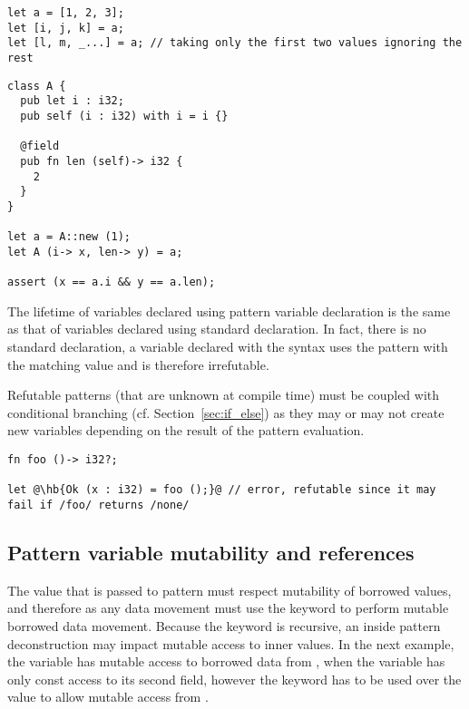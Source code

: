 \begin{lstlisting}[style=coloredverbatim, escapechar=@, caption=Array deconstruction]
let a = [1, 2, 3];
let [i, j, k] = a;
let [l, m, _...] = a; // taking only the first two values ignoring the rest
\end{lstlisting}

\begin{lstlisting}[style=coloredverbatim, caption=Class field access]
class A {
  pub let i : i32;
  pub self (i : i32) with i = i {}

  @field
  pub fn len (self)-> i32 {
    2
  }
}

let a = A::new (1);
let A (i-> x, len-> y) = a;

assert (x == a.i && y == a.len);
\end{lstlisting}

The lifetime of variables declared using pattern variable declaration is the
same as that of variables declared using standard declaration. In fact, there is
no standard declaration, a variable declared with the syntax  uses the pattern  with the matching value 
and is therefore irrefutable.

Refutable patterns (that are unknown at compile time) must be coupled with
conditional branching (cf. Section~\ref{sec:if_else}) as they may or may not
create new variables depending on the result of the pattern evaluation.

\begin{lstlisting}[style=coloredverbatim, escapechar=@]
fn foo ()-> i32?;

let @\hb{Ok (x : i32) = foo ();}@ // error, refutable since it may fail if /foo/ returns /none/
\end{lstlisting}

\subsection{Pattern variable mutability and references}

The value that is passed to pattern must respect mutability of borrowed values,
and therefore as any data movement must use the keyword  to
perform mutable borrowed data movement. Because the keyword is recursive, an
inside pattern deconstruction may impact mutable access to inner values. In the
next example, the variable  has mutable access to borrowed data from
, when the variable  has only const access to its second
field, however the keyword  has to be used over the value
 to allow mutable access from .

